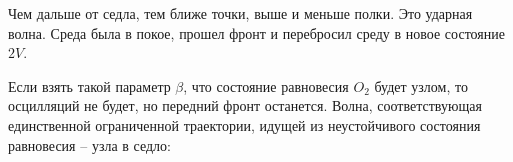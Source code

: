 Чем дальше от седла, тем ближе точки, выше и меньше полки. Это ударная волна.  Среда была в покое, прошел фронт и перебросил среду в новое состояние $2V$.


Если взять такой параметр $\beta$, что состояние равновесия $O_2$ будет узлом, то осцилляций не будет, но передний фронт останется. Волна, соответствующая единственной ограниченной траектории, идущей из неустойчивого состояния равновесия  --  узла в седло:
\begin{figure}[h]
\begin{minipage}[h]{0.49\linewidth}
\end{minipage}
\hfill
\begin{minipage}[h]{0.49\linewidth}
\end{minipage}
\end{figure}

